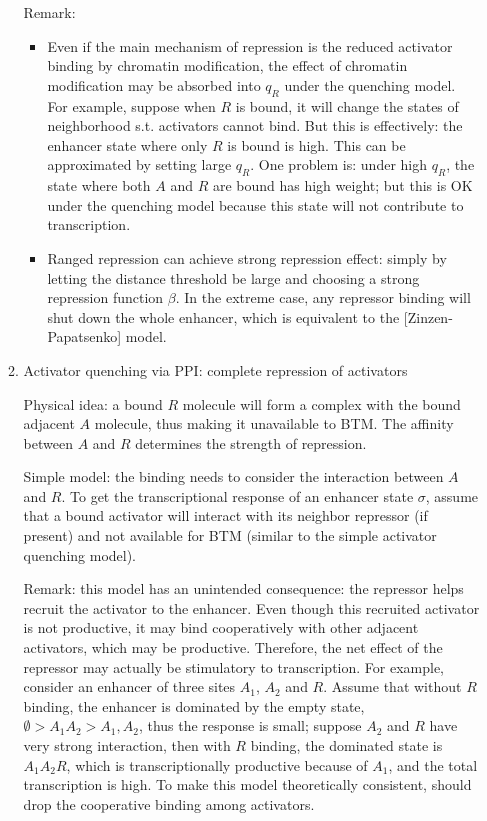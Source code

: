 \documentclass[11pt]{article}
\begin{document}
\begin{enumerate}
\begin{enumerate}
Remark: 
\begin{itemize}
\item Even if the main mechanism of repression is the reduced activator binding by chromatin modification, the effect of chromatin modification may be absorbed into $q_R$ under the quenching model. For example, suppose when $R$ is bound, it will change the states of neighborhood s.t. activators cannot bind. But this is effectively: the enhancer state where only $R$ is bound is high. This can be approximated by setting large $q_R$. One problem is: under high $q_R$, the state where both $A$ and $R$ are bound has high weight; but this is OK under the quenching model because this state will not contribute to transcription. 

\item Ranged repression can achieve strong repression effect: simply by letting the distance threshold be large and choosing a strong repression function $\beta$. In the extreme case, any repressor binding will shut down the whole enhancer, which is equivalent to the [Zinzen-Papatsenko] model. 

\end{itemize}

\item{Activator quenching via PPI: complete repression of activators}

Physical idea: a bound $R$ molecule will form a complex with the bound adjacent $A$ molecule, thus making it unavailable to BTM. The affinity between $A$ and $R$ determines the strength of repression. 

Simple model: the binding needs to consider the interaction between $A$ and $R$. To get the transcriptional response of an enhancer state $\sigma$, assume that a bound activator will interact with its neighbor repressor (if present) and not available for BTM (similar to the simple activator quenching model). 

Remark: this model has an unintended consequence: the repressor helps recruit the activator to the enhancer. Even though this recruited activator is not productive, it may bind cooperatively with other adjacent activators, which may be productive. Therefore, the net effect of the repressor may actually be stimulatory to transcription. For example, consider an enhancer of three sites $A_1$, $A_2$ and $R$. Assume that without $R$ binding, the enhancer is dominated by the empty state, $\emptyset > A_1 A_2 > A_1, A_2$, thus the response is small; suppose $A_2$ and $R$ have very strong interaction, then with $R$ binding, the dominated state is $A_1 A_2 R$, which is transcriptionally productive because of $A_1$, and the total transcription is high. To make this model theoretically consistent, should drop the cooperative binding among activators. 


\end{enumerate}
\end{enumerate}
\end{document}
